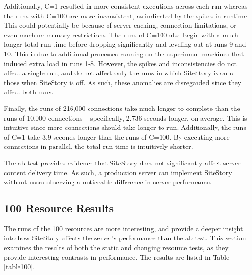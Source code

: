 \documentclass[runningheads,a4paper]{llncs}
\begin{document}
Additionally, C=1 resulted in more consistent executions across each run whereas the runs with C=100 are more inconsistent, as indicated by the spikes in runtime. This could potentially be because of server caching, connection limitations, or even machine memory restrictions. The runs of C=100 also begin with a much longer total run time before dropping significantly and leveling out at runs 9 and 10. 
This is due to additional processes running on the experiment machines that induced extra load in runs 1-8. However, the spikes and inconsistencies do not affect a single run, and do not affect only the runs in which SiteStory is on or those when SiteStory is off. As such, these anomalies are disregarded since they affect both runs.

Finally, the runs of 216,000 connections take much longer to complete than the runs of 10,000 connections -- specifically, 2.736 seconds longer, on average. This is intuitive since more connections should take longer to run. Additionally, the runs of C=1 take 3.9 seconds longer than the runs of C=100. By executing more connections in parallel, the total run time is intuitively shorter. 

The ab test provides evidence that SiteStory does not significantly affect server content delivery time. As such, a production server can implement SiteStory without users observing a noticeable difference in server performance. 

\subsection{100 Resource Results}
\label{staticresults}
\vskip -3mm
The runs of the 100 resources are more interesting, and provide a deeper insight into how SiteStory affects the server's performance than the ab test. This section examines the results of both the static and changing resource tests, as they provide interesting contrasts in performance. The results are listed in Table \ref{table100}.

\end{document}
